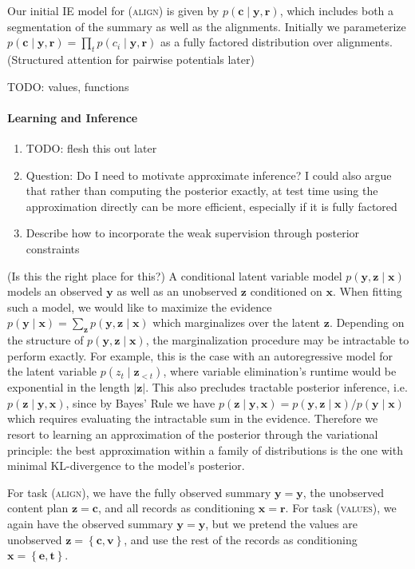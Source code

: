 \documentclass[11pt]{article}
\newcommand\set[1]{\left\{#1\right\}}
\newcommand{\bc}{\mathbf{c}}
\newcommand{\be}{\mathbf{e}}
\newcommand{\br}{\mathbf{r}}
\newcommand{\bt}{\mathbf{t}}
\newcommand{\bv}{\mathbf{v}}
\newcommand{\bx}{\mathbf{x}}
\newcommand{\by}{\mathbf{y}}
\newcommand{\bz}{\mathbf{z}}
\begin{document}
Our initial IE model for (\textsc{align}) is given by $p(\bc\mid\by,\br)$,
which includes both a segmentation of the summary as well as the alignments.
Initially we parameterize $p(\bc\mid\by,\br)=\prod_tp(c_i\mid\by,\br)$ as
a fully factored distribution over alignments.
(Structured attention for pairwise potentials later)

TODO: values, functions

\paragraph{Learning and Inference}
\begin{enumerate}
\item TODO: flesh this out later
\item Question: Do I need to motivate approximate inference?
I could also argue that rather than computing the posterior exactly,
at test time using the approximation directly can be more efficient,
especially if it is fully factored
\item Describe how to incorporate the weak supervision through posterior constraints
\end{enumerate}
(Is this the right place for this?) A conditional latent variable model $p(\by,\bz\mid\bx)$ models an
observed $\by$ as well as an unobserved $\bz$ conditioned on $\bx$.
When fitting such a model, we would like to maximize the evidence
$p(\by\mid\bx)=\sum_\bz p(\by,\bz\mid\bx)$ which marginalizes over
the latent $\bz$.
Depending on the structure of $p(\by,\bz\mid\bx)$,
the marginalization procedure may be intractable to perform exactly.
For example, this is the case with an autoregressive model for the latent
variable $p(z_t\mid \bz_{<t})$, where variable elimination's runtime would be
exponential in the length $|\bz|$.
This also precludes tractable posterior inference, i.e. $p(\bz\mid\by,\bx)$,
since by Bayes' Rule we have $p(\bz\mid\by,\bx)=p(\by,\bz\mid\bx)/p(\by\mid\bx)$
which requires evaluating the intractable sum in the evidence.
Therefore we resort to learning an approximation of the posterior through the variational principle:
the best approximation within a family of distributions is the one with minimal KL-divergence
to the model's posterior.

For task (\textsc{align}), we have the fully observed summary $\by=\by$,
the unobserved content plan $\bz=\bc$, and all records as conditioning $\bx=\br$.
For task (\textsc{values}), we again have the observed summary $\by=\by$,
but we pretend the values are unobserved $\bz=\set{\bc,\bv}$, and
use the rest of the records as conditioning $\bx=\set{\be,\bt}$.
\end{document}
